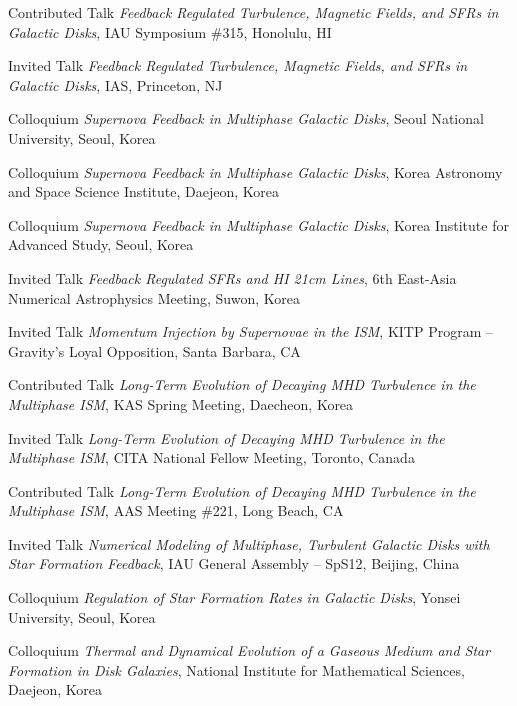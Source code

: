 \documentclass[12pt]{article}
\begin{document}
{Contributed Talk}
{\emph{Feedback Regulated Turbulence, Magnetic Fields, and SFRs in Galactic Disks},
IAU Symposium \#315,
Honolulu, HI}

{Invited Talk}
{\emph{Feedback Regulated Turbulence, Magnetic Fields, and SFRs in Galactic Disks},
IAS,
Princeton, NJ}

{Colloquium}
{\emph{Supernova Feedback in Multiphase Galactic Disks},
Seoul National University,
Seoul, Korea}

{Colloquium}
{\emph{Supernova Feedback in Multiphase Galactic Disks},
Korea Astronomy and Space Science Institute,
Daejeon, Korea}

{Colloquium}
{\emph{Supernova Feedback in Multiphase Galactic Disks},
Korea Institute for Advanced Study,
Seoul, Korea}

{Invited Talk}
{\emph{Feedback Regulated SFRs and HI 21cm Lines},
6th East-Asia Numerical Astrophysics Meeting,
Suwon, Korea}

{Invited Talk}
{\emph{Momentum Injection by Supernovae in the ISM},
KITP Program -- Gravity's Loyal Opposition,
Santa Barbara, CA}

{Contributed Talk}
{\emph{Long-Term Evolution of Decaying MHD Turbulence in the Multiphase ISM},
KAS Spring Meeting,
Daecheon, Korea}

{Invited Talk}
{\emph{Long-Term Evolution of Decaying MHD Turbulence in the Multiphase ISM},
CITA National Fellow Meeting,
Toronto, Canada}

{Contributed Talk}
{\emph{Long-Term Evolution of Decaying MHD Turbulence in the Multiphase ISM},
AAS Meeting \#221,
Long Beach, CA}

{Invited Talk}
{\emph{Numerical Modeling of Multiphase, Turbulent Galactic Disks with Star Formation Feedback},
IAU General Assembly -- SpS12,
Beijing, China}

{Colloquium}
{\emph{Regulation of Star Formation Rates in Galactic Disks},
Yonsei University,
Seoul, Korea}

{Colloquium}
{\emph{Thermal and Dynamical Evolution of a Gaseous Medium and Star Formation in Disk Galaxies},
National Institute for Mathematical Sciences,
Daejeon, Korea}
\end{document}
